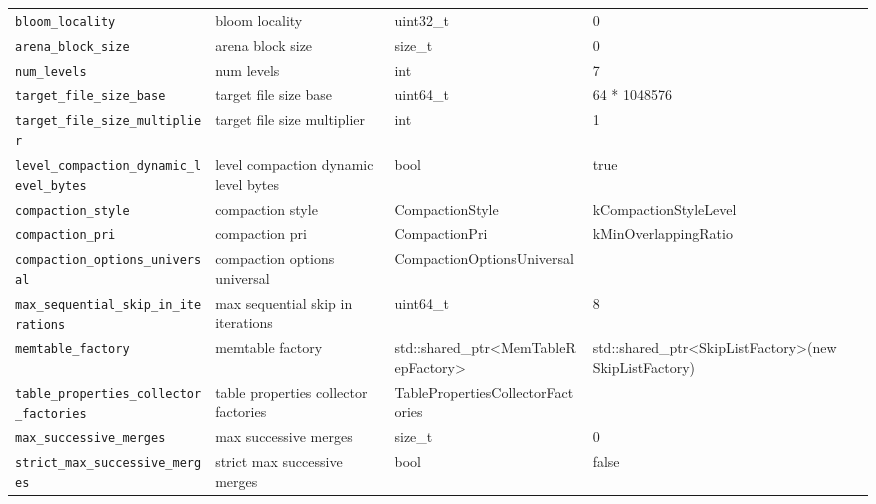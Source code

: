 {{\begin{longtable}{@{}p{3.4cm}p{5.0cm}p{3.6cm}p{2.5cm}p{2.6cm}@{}}
    \texttt{bloom\_locality}
    & bloom locality
    & uint32\_t
    & 0
    & \\

    \texttt{arena\_block\_size}
    & arena block size
    & size\_t
    & 0
    & \\

    \texttt{num\_levels}
    & num levels
    & int
    & 7
    & \\

    \texttt{target\_file\_size\_base}
    & target file size base
    & uint64\_t
    & 64 * 1048576
    & \\

    \texttt{target\_file\_size\_multiplier}
    & target file size multiplier
    & int
    & 1
    & \\

    \texttt{level\_compaction\_dynamic\_level\_bytes}
    & level compaction dynamic level bytes
    & bool
    & true
    & \\

    \texttt{compaction\_style}
    & compaction style
    & CompactionStyle
    & kCompactionStyleLevel
    & \\

    \texttt{compaction\_pri}
    & compaction pri
    & CompactionPri
    & kMinOverlappingRatio
    & \\

    \texttt{compaction\_options\_universal}
    & compaction options universal
    & CompactionOptionsUniversal
    & 
    & \\

    \texttt{max\_sequential\_skip\_in\_iterations}
    & max sequential skip in iterations
    & uint64\_t
    & 8
    & \\

    \texttt{memtable\_factory}
    & memtable factory
    & std::shared\_ptr\textless{}MemTableRepFactory\textgreater{}
    & std::shared\_ptr\textless{}SkipListFactory\textgreater{}(new SkipListFactory)
    & \\

    \texttt{table\_properties\_collector\_factories}
    & table properties collector factories
    & TablePropertiesCollectorFactories
    & 
    & \\

    \texttt{max\_successive\_merges}
    & max successive merges
    & size\_t
    & 0
    & \\

    \texttt{strict\_max\_successive\_merges}
    & strict max successive merges
    & bool
    & false
    & \\


\end{longtable}}}
